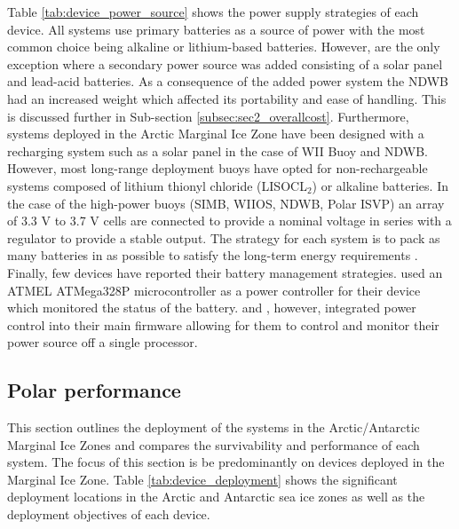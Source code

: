 Table \ref{tab:device_power_source} shows the power supply strategies of each device. All systems use primary batteries as a source of power with the most common choice being alkaline or lithium-based batteries. However, \textcite{doble2017robust} are the only exception where a secondary power source was added consisting of a solar panel and lead-acid batteries. As a consequence of the added power system the NDWB had an increased weight which affected its portability and ease of handling. This is discussed further in Sub-section \ref{subsec:sec2_overallcost}. Furthermore, systems deployed in the Arctic Marginal Ice Zone have been designed with a recharging system such as a solar panel in the case of WII Buoy and NDWB. However, most long-range deployment buoys have opted for non-rechargeable systems composed of lithium thionyl chloride (LISOCL$_2$) or alkaline batteries. In the case of the high-power buoys (SIMB, WIIOS, NDWB, Polar ISVP) an array of 3.3 V to 3.7 V cells are connected to provide a nominal voltage in series with a regulator to provide a stable output. The strategy for each system is to pack as many batteries in as possible to satisfy the long-term energy requirements \cite{doble2017robust,rabault2019open}. Finally, few devices have reported their battery management strategies. \textcite{rabault2019open} used an ATMEL ATMega328P microcontroller as a power controller for their device which monitored the status of the battery. \textcite{trident} and \textcite{kohout2015device}, however, integrated power control into their main firmware allowing for them to control and monitor their power source off a single processor.

\subsection{Polar performance}

This section outlines the deployment of the systems in the Arctic/Antarctic Marginal Ice Zones and compares the survivability and performance of each system. The focus of this section is be predominantly on devices deployed in the Marginal Ice Zone. Table \ref{tab:device_deployment} shows the significant deployment locations in the Arctic and Antarctic sea ice zones as well as the deployment objectives of each device. 

